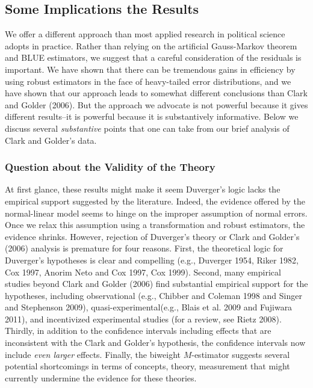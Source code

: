 \documentclass[12pt]{article}
\begin{document}
\subsection*{Some Implications the Results}

We offer a different approach than most applied research in political science adopts in practice. 
Rather than relying on the artificial Gauss-Markov theorem and BLUE estimators, we suggest that a careful consideration of the residuals is important. 
We have shown that there can be tremendous gains in efficiency by using robust estimators in the face of heavy-tailed error distributions, and we have shown that our approach leads to somewhat different conclusions than Clark and Golder (2006). 
But the approach we advocate is not powerful because it gives different results--it is powerful because it is substantively informative. 
Below we discuss several \textit{substantive} points that one can take from our brief analysis of Clark and Golder's data.

\subsubsection*{Question about the Validity of the Theory}

At first glance, these results might make it seem Duverger's logic lacks the empirical support suggested by the literature. Indeed, the evidence offered by the normal-linear model seems to hinge on the improper assumption of normal errors. 
Once we relax this assumption using a transformation and robust estimators, the evidence shrinks. However, rejection of Duverger's theory or Clark and Golder's (2006) analysis is premature for four reasons. 
First, the theoretical logic for Duverger's hypotheses is clear and compelling (e.g., Duverger 1954, Riker 1982, Cox 1997, Anorim Neto and Cox 1997, Cox 1999). 
Second, many empirical studies beyond Clark and Golder (2006) find substantial empirical support for the hypotheses, including observational (e.g., Chibber and Coleman 1998 and Singer and Stephenson 2009), quasi-experimental(e.g., Blais et al. 2009 and Fujiwara 2011), and incentivized experimental studies (for a review, see Rietz 2008). 
Thirdly, in addition to the confidence intervals including effects that are inconsistent with the Clark and Golder's hypothesis, the confidence intervals now include \textit{even larger} effects.
Finally, the biweight $M$-estimator suggests several potential shortcomings in terms of concepts, theory, measurement that might currently undermine the evidence for these theories.
\end{document}
